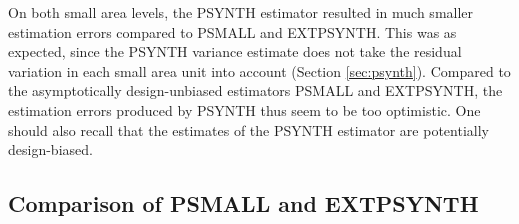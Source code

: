 \documentclass[remotesensing,article,accept,moreauthors,pdftex,10pt,a4paper]{Definitions/mdpi}
\newcommand{\psynth}{PSYNTH}
\newcommand{\psmall}{PSMALL}
\newcommand{\extpsynth}{EXTPSYNTH}
\begin{document}
On both small area levels, the \psynth{} estimator resulted in much smaller estimation errors compared to \psmall{} and \extpsynth{}. This was as expected, since the \psynth{} variance estimate does not take the residual variation in each small area unit into account (Section \ref{sec:psynth}). Compared to the asymptotically design-unbiased estimators \psmall{} and \extpsynth{}, the estimation errors produced by \psynth{} thus seem to be too optimistic. One should also recall that the estimates of the \psynth{} estimator are potentially design-biased.


\subsection{Comparison of \psmall{} and \extpsynth{}}
\label{sec:comp}
\end{document}
